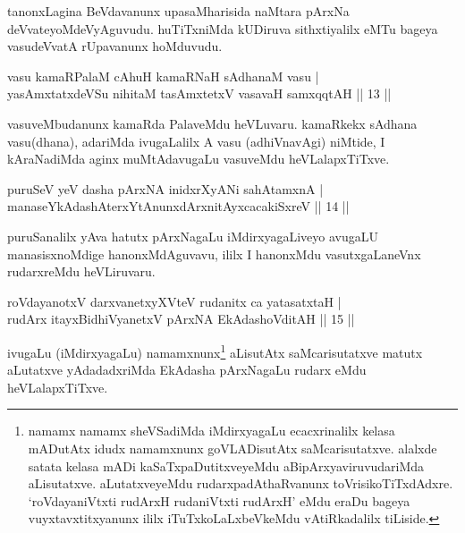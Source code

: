 \begin{artha}
tanonxLagina BeVdavanunx upasaMharisida naMtara pArxNa deVvateyoMdeVyAgu\-vudu. huTiTxniMda kUDiruva sithxtiyalilx eMTu bageya vasudeVvatA rUpavanunx hoMduvudu.
\end{artha}


\begin{shl}
vasu kamaRPalaM cA\s \s huH kamaRNaH sAdhanaM vasu |\\
yasAmxtatxdeVSu nihitaM tasAmxtetxV vasavaH samxqqtAH \hfill || 13 ||
\end{shl}

\begin{artha}
vasuveMbudanunx kamaRda PalaveMdu heVLuvaru. kamaRkekx sAdhana vasu(dhana), adariMda ivugaLalilx A vasu (adhiVnavAgi) niMtide, I kAraNadiMda aginx muMtAdavugaLu vasuveMdu heVLalapxTiTxve.
\end{artha}


\begin{shl}
puruSeV yeV dasha pArxNA inidxrXyANi sahA\s \s tamxnA |\\
manaseYkAdashAterxYtAnunxdArxnitAyxcacakiSxreV \hfill || 14 ||
\end{shl}

\begin{artha}
puruSanalilx yAva hatutx pArxNagaLu iMdirxyagaLiveyo avugaLU manasisx\-noMdige hanonxMdAguvavu, ililx I hanonxMdu vasutxgaLaneVnx rudarxreMdu heVLiruvaru.
\end{artha}


\begin{shl}
roVdayanotxV darxvanetxyXVteV rudanitx ca yatasatxtaH |\\
rudArx itayxBidhiVyanetxV pArxNA EkAdashoVditAH \hfill || 15 ||
\end{shl}

\begin{artha}
ivugaLu (iMdirxyagaLu) namamxnunx\footnote[1]{namamx namamx sheVSadiMda iMdirxyagaLu ecacxrinalilx kelasa mADutAtx idudx namamxnunx goVLADisutAtx saMcarisutatxve. alalxde satata kelasa mADi kaSaTxpaDutitxveyeMdu aBipArxyaviruvudariMda aLisutatxve. aLutatxveyeMdu rudarxpadAthaRvanunx toVrisikoTiTxdAdxre. `roVdayaniVtxti rudArxH rudaniVtxti rudArxH' eMdu eraDu bageya vuyxtavxtitxyanunx ililx iTuTxkoLaLxbeVkeMdu vAtiRkadalilx tiLiside.} aLisutAtx saMcarisutatxve matutx aLutatxve yAdadadxriMda EkAdasha pArxNagaLu rudarx eMdu heVLalapxTiTxve.
\end{artha}

